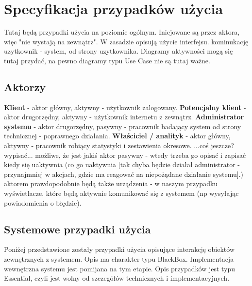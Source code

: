 \documentclass[10pt,a4paper,titlepage]{article} %
\begin{document}
	
	\section{Specyfikacja przypadków użycia}	
	
		Tutaj będą przypadki użycia na poziomie ogólnym. Inicjowane są przez aktora, więc "nie wystają na zewnątrz". W zasadzie opisują użycie interfejsu. kominukację uzytkownik - system, od strony uzytkownika.\newline
		Diagramy aktywności mogą się tutaj przydać, na pewno diagramy typu Use Case nie są tutaj ważne.\newline
		\subsection{Aktorzy}
		{\bf Klient} - aktor główny, aktywny - użytkownik zalogowany.\newline
		{\bf Potencjalny klient} - aktor drugorzędny, aktywny - użytkownik internetu z zewnątrz.\newline
		{\bf Administrator systemu} - aktor drugorzędny, pasywny - pracownik badający system od strony technicznej - poprawnego działania.\newline
		{\bf Właściciel / analityk} - aktor główny, aktywny - pracownik robiący statystyki i zestawienia okresowe.\newline
		...coś jeszcze? wypisać...\newline
		możliwe, że jest jakiś aktor pasywny - wtedy trzeba go opisać i zapisać kiedy się uaktywnia (co go uaktywnia [tak chyba będzie działał administrator - przynajmniej w akcjach, gdzie ma reagować na niepożądane działanie systemu].)\newline
		aktorem prawdopodobnie będą także urządzenia - w naszym przypadku wyświetlacze, które będą aktywnie komunikować się z systemem (np wysyłając powiadomienia o błędzie).\newline
		\subsection{Systemowe przypadki użycia}
		Poniżej przedstawione zostały przypadki użycia opisujące interakcję obiektów zewnętrznych z systemem.\newline
		Opis ma charakter typu BlackBox. Implementacja wewnętrzna systemu jest pomijana na tym etapie. Opis przypadków jest typu Essential, czyli jest wolny od szczegółów technicznych i implementacyjnych.\newline
\end{document}
